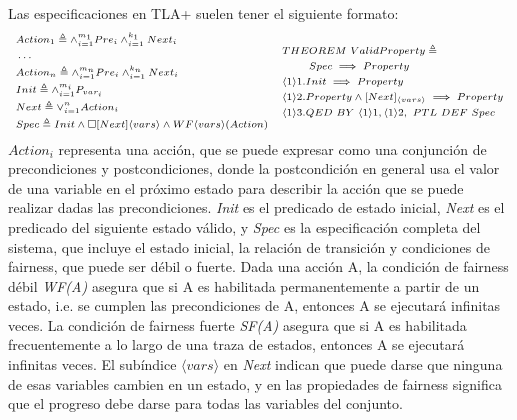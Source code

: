 \documentclass[runningheads]{llncs}
\begin{document}
Las especificaciones en TLA+ suelen tener el siguiente formato:
%
\[
\begin{array}{cc}
\begin{scriptsize}
\begin{aligned}
    & Action_1 \triangleq \land_{i=1}^{m_1} Pre_i \land_{i=1}^{k_1} Next_i \\
    & \dots \\
    & Action_n \triangleq \land_{i=1}^{m_n} Pre_i \land_{i=1}^{k_n} Next_i \\
    & Init \triangleq \land_{i=1}^{m_i} P_{var_i} \\
    & Next \triangleq \lor_{i=1}^{n} Action_i \\
    & Spec \triangleq Init \land \square [Next]{\langle vars \rangle} \land WF{\langle vars \rangle}(Action)
\end{aligned}
\end{scriptsize}
&
\begin{scriptsize}
\begin{aligned}
    & THEOREM\ ValidProperty \triangleq \\
    & \phantom{THE} Spec \implies Property \\
    & \langle 1 \rangle1. Init \implies Property \\
    & \langle 1 \rangle2. Property \land [Next]_{\langle vars \rangle} \implies Property \\
    & \langle 1 \rangle3. QED\ BY\ \langle 1 \rangle1, \langle 1 \rangle2,\ PTL\ DEF\ Spec
\end{aligned}
\end{scriptsize}
\end{array}
\]
%
$Action_{i}$ representa una acción, que se puede expresar como una conjunción de precondiciones y postcondiciones, donde la postcondición en general usa el valor de una variable en el próximo estado para describir la acción que se puede realizar dadas las precondiciones. \textit{Init} es el predicado de estado inicial, \textit{Next} es el predicado del siguiente estado válido, y \textit{Spec} es la especificación completa del sistema, que incluye el estado inicial, la relación de transición y condiciones de fairness, que puede ser débil o fuerte. Dada una acción A, la condición de fairness débil \textit{WF(A)} asegura que si A es habilitada permanentemente a partir de un estado, i.e. se cumplen las precondiciones de A, entonces A se ejecutará infinitas veces. La condición de fairness fuerte \textit{SF(A)} asegura que si A es habilitada frecuentemente a lo largo de una traza de estados, entonces A se ejecutará infinitas veces. El subíndice $\langle vars \rangle$ en \textit{Next} indican que puede darse que ninguna de esas variables cambien en un estado, y en las propiedades de fairness significa que el progreso debe darse para todas las variables del conjunto. 
\end{document}
